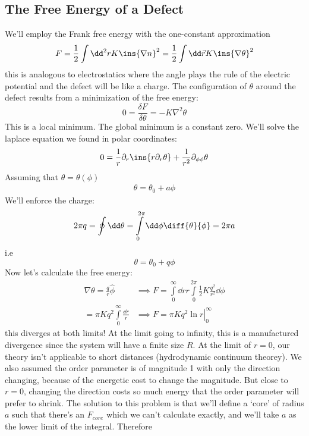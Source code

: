 \subsection{The Free Energy of a Defect}
We'll employ the Frank free energy with the one-constant approximation
\begin{equation}
    F = \frac{1}{2}\int\dd^2 r K \ins{\nabla n}^2 = \frac{1}{2}\int\dd \vec{r} K\ins{\nabla\theta}^2
\end{equation}
this is analogous to electrostatics where the angle plays the rule of the electric potential and the defect will be like a charge. The configuration of \(\theta\) around the defect results from a minimization of the free energy:
\begin{equation}
    0 = \frac{\delta F}{\delta \theta} = -K\nabla^2\theta
\end{equation}
This is a local minimum. The global minimum is a constant zero. We'll solve the laplace equation we found in polar coordinates:
\begin{align}
    0 = \frac{1}{r}\partial_r\ins{r\partial_r\theta}+\frac{1}{r^2}\partial_{\phi\phi}\theta
\end{align}
Assuming that \(\theta = \theta(\phi)\)
\begin{align}
    \theta = \theta_0 + a\phi
\end{align}
We'll enforce the charge:
\begin{align}
    2\pi q = \oint\dd\theta = \int\limits_0^{2\pi}\dd\phi\diff{\theta}{\phi} = 2\pi a
\end{align}
i.e
\begin{equation}
    \boxed{\theta = \theta_0+q\phi}
\end{equation}
Now let's calculate the free energy:
\begin{align}
    \nabla\theta = \frac{q}{r}\hat{\phi} &\implies F = \int\limits_0^\infty\dd r r \int\limits_0^{2\pi}\frac{1}{2}K\frac{q^2}{r^2}\dd \phi \\
    = \pi Kq^2\int\limits_0^\infty\frac{\dd r}{r} &\implies F = \pi \left.Kq^2\ln r \right\vert_0^\infty
\end{align}
this diverges at both limits! At the limit going to infinity, this is a manufactured divergence since the system will have a finite size \(R\). At the limit of \(r=0\), our theory isn't applicable to short distances (hydrodynamic continuum theorey). We also assumed the order parameter is of magnitude 1 with only the direction changing, because of the energetic cost to change the magnitude. But close to \(r=0\), changing the direction costs so much energy that the order parameter will prefer to shrink. The solution to this problem is that we'll define a `core' of radius \(a\) such that there's an \(F_{core}\) which we can't calculate exactly, and we'll take \(a\) as the lower limit of the integral. Therefore

